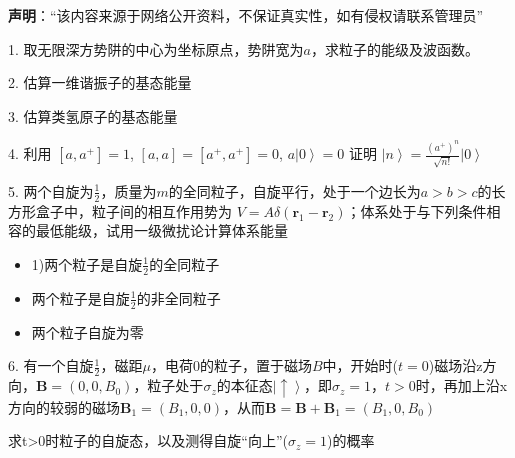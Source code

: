 
\textbf{声明}：“该内容来源于网络公开资料，不保证真实性，如有侵权请联系管理员”


1. 取无限深方势阱的中心为坐标原点，势阱宽为$a$，求粒子的能级及波函数。

2. 估算一维谐振子的基态能量

3. 估算类氢原子的基态能量

4. 利用 $[a,a^+]=1$, \quad $[a,a]=[a^+,a^+]=0$, \quad $a \left| 0 \right\rangle =0$ 证明 $\left| n \right\rangle = \frac{(a^+)^n}{\sqrt{n!}} \left| 0 \right\rangle$

5. 两个自旋为$\frac{1}{2}$，质量为$m$的全同粒子，自旋平行，处于一个边长为$a>b>c$的长方形盒子中，粒子间的相互作用势为 $V=A\delta (\mathbf{r}_1 - \mathbf{r}_2)$；体系处于与下列条件相容的最低能级，试用一级微扰论计算体系能量

\begin{itemize}
    \item 1)两个粒子是自旋$\frac{1}{2}$的全同粒子
    \item 两个粒子是自旋$\frac{1}{2}$的非全同粒子
    \item 两个粒子自旋为零
\end{itemize}

6. 有一个自旋$\frac{1}{2}$，磁距$\mu$，电荷0的粒子，置于磁场$B$中，开始时($t=0$)磁场沿z方向，$\mathbf{B}= \left( 0, 0, B_0 \right)$，粒子处于$\sigma_z$的本征态$\left| \uparrow \right\rangle$，即$\sigma_z = 1$，$t>0$时，再加上沿x方向的较弱的磁场$\mathbf{B}_1 = \left( B_1, 0, 0 \right)$，从而$\mathbf{B} = \mathbf{B} + \mathbf{B}_1 = \left( B_1, 0, B_0 \right)$

求t>0时粒子的自旋态，以及测得自旋“向上”($\sigma_z=1$)的概率

